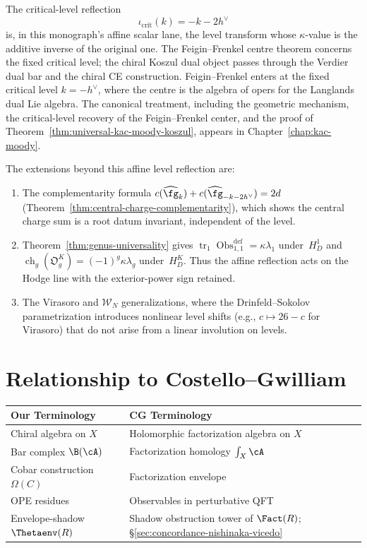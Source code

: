 \begin{remark}\label{rem:feigin-frenkel-comparison}
The critical-level reflection
\[
\iota_{\mathrm{crit}}(k)=-k-2h^\vee
\]
is, in this monograph's affine scalar lane, the level transform whose
\(\kappa\)-value is the additive inverse of the original one.  The
Feigin--Frenkel centre theorem concerns the fixed critical level;
the chiral Koszul dual object passes through the Verdier dual bar and
the chiral CE construction. Feigin--Frenkel enters at the fixed
critical level \(k=-h^\vee\), where the centre is the algebra of
opers for the Langlands dual Lie algebra. The canonical treatment,
including the geometric mechanism, the critical-level recovery of the
Feigin--Frenkel center, and the proof of
Theorem~\ref{thm:universal-kac-moody-koszul}, appears in
Chapter~\ref{chap:kac-moody}.

The extensions beyond this affine level reflection are:
\begin{enumerate}[label=(\roman*)]
\item The complementarity formula $c(\widehat{\fg}_k) + c(\widehat{\fg}_{-k-2h^\vee}) = 2d$
 (Theorem~\ref{thm:central-charge-complementarity}), which shows the
 central charge sum is a root datum invariant, independent of the level.
\item Theorem~\ref{thm:genus-universality} gives
$\operatorname{tr}_1\operatorname{Obs}^{\mathrm{def}}_{1,1}
=\kappa\lambda_1$ under~$H_D^1$ and
$\operatorname{ch}_g(\mathfrak O_g^K)=(-1)^g\kappa\lambda_g$
under~$H_D^K$.  Thus the affine reflection acts on the Hodge line
with the exterior-power sign retained.
\item The Virasoro and $\mathcal{W}_N$ generalizations, where the
 Drinfeld--Sokolov parametrization introduces nonlinear level shifts
 (e.g., $c \mapsto 26 - c$ for Virasoro) that do not arise from a linear
 involution on levels.
\end{enumerate}
\end{remark}


\section{Relationship to Costello--Gwilliam}

\begin{tabular}{>{\raggedright\arraybackslash}p{}>{\raggedright\arraybackslash}p{}}
\textbf{Our Terminology} & \textbf{CG Terminology} \\
\hline
Chiral algebra on $X$ & Holomorphic factorization algebra on $X$ \\
Bar complex $\B(\cA)$ & Factorization homology $\int_X \cA$ \\
Cobar construction $\Omega(C)$ & Factorization envelope \\
OPE residues & Observables in perturbative QFT \\
Envelope-shadow $\Thetaenv(R)$ & Shadow obstruction tower of $\Fact(R)$; \S\ref{sec:concordance-nishinaka-vicedo} \\
\end{tabular}

